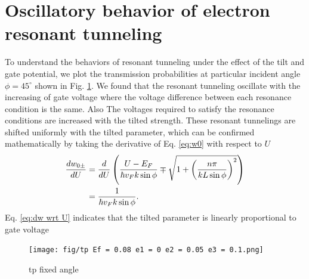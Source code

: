\section{Oscillatory behavior of electron resonant tunneling}
    To understand the behaviors of resonant tunneling under the effect of the tilt and gate potential, 
    we plot the transmission probabilities at particular incident angle $\phi = 45^{\circ}$ shown in Fig. \ref{fig:tp 45 deg}.
    We found that the resonant tunneling oscillate with the increasing of gate voltage where the voltage difference between each resonance condition is the same.
    Also The voltages required to satisfy the resonance conditions are increased with the tilted strength.
    These resonant tunnelings are shifted uniformly with the tilted parameter, which can be confirmed mathematically by taking the derivative of Eq. \ref{eq:w0} with respect to $U$
    \begin{align} \label{eq:dw wrt U}
        \frac{d w_{0\pm}}{dU} &= \frac{d}{dU} \left(\frac{U-E_F}{\hbar v_F k \sin{\phi}}\mp \sqrt{1+\left(\frac{n \pi}{k L \sin{\phi}}\right)^2}\right) \notag \\
                              &= \frac{1}{\hbar v_F k \sin{\phi}}.
    \end{align}
    Eq. \ref{eq:dw wrt U} indicates that the tilted parameter is linearly proportional to gate voltage
    \begin{figure}[H]
        \centering
            \texttt{[image: fig/tp Ef = 0.08 e1 = 0 e2 = 0.05 e3 = 0.1.png]}
            \caption{tp fixed angle}
        \label{fig:tp 45 deg}
    \end{figure}

